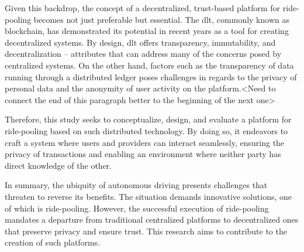 Given this backdrop, the concept of a decentralized, trust-based platform for ride-pooling becomes not just preferable but essential. The \gls{dlt}, commonly known as blockchain, has demonstrated its potential in recent years as a tool for creating decentralized systems. By design, \gls{dlt} offers transparency, immutability, and decentralization – attributes that can address many of the concerns posed by centralized systems. On the other hand, factors such as the  transparency of data running through a distributed ledger poses challenges in regards to the privacy of personal data and the anonymity of user activity on the platform.<Need to connect the end of this paragraph better to the beginning of the next one>

Therefore, this study seeks to conceptualize, design, and evaluate a platform for ride-pooling based on such distributed technology. By doing so, it endeavors to craft a system where users and providers can interact seamlessly, ensuring the privacy of transactions and enabling an environment where neither party has direct knowledge of the other.

In summary, the ubiquity of autonomous driving presents challenges that threaten to reverse its benefits. The situation demands innovative solutions, one of which is ride-pooling. However, the successful execution of ride-pooling mandates a departure from traditional centralized platforms to decentralized ones that preserve privacy and ensure trust. This research aims to contribute to the creation of such platforms.




